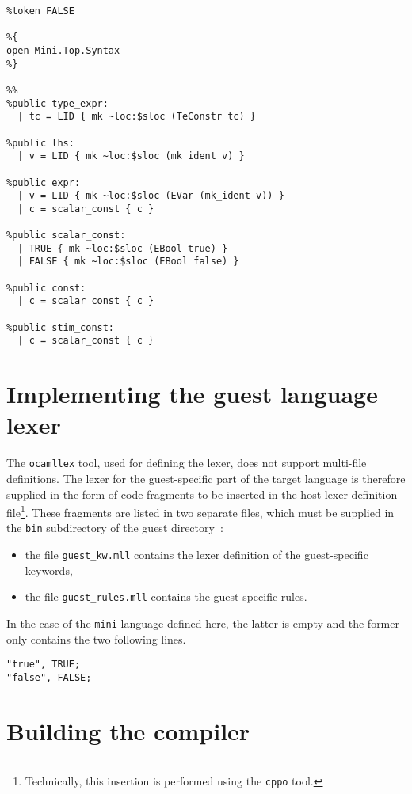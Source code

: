 \begin{lstlisting}[language={menhir},frame=single,basicstyle=\small,caption={File
    guest_parser.mly},label={lst:mini-eval}]
%token TRUE
%token FALSE

%{
open Mini.Top.Syntax
%}

%%
%public type_expr:
  | tc = LID { mk ~loc:$sloc (TeConstr tc) }

%public lhs:
  | v = LID { mk ~loc:$sloc (mk_ident v) }

%public expr:
  | v = LID { mk ~loc:$sloc (EVar (mk_ident v)) }
  | c = scalar_const { c }

%public scalar_const:
  | TRUE { mk ~loc:$sloc (EBool true) }
  | FALSE { mk ~loc:$sloc (EBool false) }

%public const:
  | c = scalar_const { c }

%public stim_const: 
  | c = scalar_const { c }

\end{lstlisting}

\section{Implementing the guest language lexer}

The \texttt{ocamllex} tool, used for defining the lexer, does not support multi-file definitions.
The lexer for the guest-specific part of the target language is therefore supplied in the form of
code fragments to be inserted in the host lexer definition file\footnote{Technically, this insertion is
  performed using the \texttt{cppo} tool.}. These fragments are listed in two separate files, which
must be supplied in the \texttt{bin} subdirectory of the guest directory~:
\begin{itemize}
\item the file \texttt{guest_kw.mll} contains the lexer definition of the guest-specific keywords,
\item the file \texttt{guest_rules.mll} contains the guest-specific rules.
\end{itemize}

In the case of the \texttt{mini} language defined here, the latter is empty and the former only
contains the two following lines.

\begin{verbatim}
"true", TRUE;
"false", FALSE;
\end{verbatim}

\section{Building the compiler}

